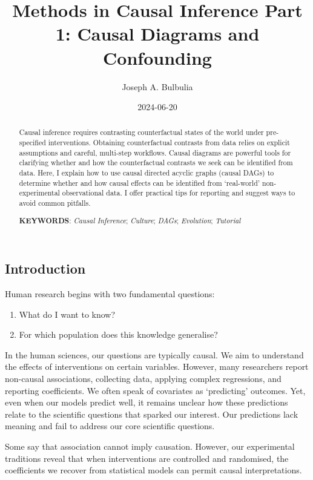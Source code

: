 \documentclass[
  single column]{article}
\title{Methods in Causal Inference Part 1: Causal Diagrams and
Confounding}
\author{Joseph A. Bulbulia}
\affil{%
             \small{     Victoria University of Wellington, NEW ZEALAND
          ORCID \textcolor[HTML]{A6CE39}{\aiOrcid} ~0000-0002-5861-2056 }
              }
\date{2024-06-20}
\providecommand{\tightlist}{%
  \setlength{\itemsep}{0pt}\setlength{\parskip}{0pt}}\usepackage{longtable,booktabs,array}
\begin{document}
\maketitle
\begin{abstract}
Causal inference requires contrasting counterfactual states of the world
under pre-specified interventions. Obtaining counterfactual contrasts
from data relies on explicit assumptions and careful, multi-step
workflows. Causal diagrams are powerful tools for clarifying whether and
how the counterfactual contrasts we seek can be identified from data.
Here, I explain how to use causal directed acyclic graphs (causal DAGs)
to determine whether and how causal effects can be identified from
`real-world' non-experimental observational data. I offer practical tips
for reporting and suggest ways to avoid common pitfalls.

\textbf{KEYWORDS}: \emph{Causal Inference}; \emph{Culture}; \emph{DAGs};
\emph{Evolution}; \emph{Tutorial}
\end{abstract}

\subsection{Introduction}\label{id-sec-introduction}

Human research begins with two fundamental questions:

\begin{enumerate}
\def\labelenumi{\arabic{enumi}.}
\tightlist
\item
  What do I want to know?
\item
  For which population does this knowledge generalise?
\end{enumerate}

In the human sciences, our questions are typically causal. We aim to
understand the effects of interventions on certain variables. However,
many researchers report non-causal associations, collecting data,
applying complex regressions, and reporting coefficients. We often speak
of covariates as `predicting' outcomes. Yet, even when our models
predict well, it remains unclear how these predictions relate to the
scientific questions that sparked our interest. Our predictions lack
meaning and fail to address our core scientific questions.

Some say that association cannot imply causation. However, our
experimental traditions reveal that when interventions are controlled
and randomised, the coefficients we recover from statistical models can
permit causal interpretations.
\end{document}
